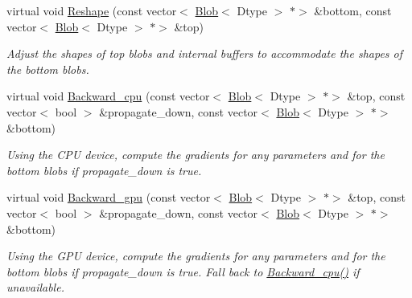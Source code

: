 \begin{DoxyCompactItemize}
\item 
virtual void \mbox{\hyperlink{classcaffe_1_1_base_data_layer_a2955d06a5e67609582fb293a0a37673f}{Reshape}} (const vector$<$ \mbox{\hyperlink{classcaffe_1_1_blob}{Blob}}$<$ Dtype $>$ $\ast$$>$ \&bottom, const vector$<$ \mbox{\hyperlink{classcaffe_1_1_blob}{Blob}}$<$ Dtype $>$ $\ast$$>$ \&top)
\begin{DoxyCompactList}\small\item\em Adjust the shapes of top blobs and internal buffers to accommodate the shapes of the bottom blobs. \end{DoxyCompactList}\item 
\mbox{\label{classcaffe_1_1_base_data_layer_a9d2c7a18383ff7625d80806ede1d9e3b}} 
virtual void \mbox{\hyperlink{classcaffe_1_1_base_data_layer_a9d2c7a18383ff7625d80806ede1d9e3b}{Backward\+\_\+cpu}} (const vector$<$ \mbox{\hyperlink{classcaffe_1_1_blob}{Blob}}$<$ Dtype $>$ $\ast$$>$ \&top, const vector$<$ bool $>$ \&propagate\+\_\+down, const vector$<$ \mbox{\hyperlink{classcaffe_1_1_blob}{Blob}}$<$ Dtype $>$ $\ast$$>$ \&bottom)
\begin{DoxyCompactList}\small\item\em Using the C\+PU device, compute the gradients for any parameters and for the bottom blobs if propagate\+\_\+down is true. \end{DoxyCompactList}\item 
\mbox{\label{classcaffe_1_1_base_data_layer_a537656c76260c7f669c713506a5f4651}} 
virtual void \mbox{\hyperlink{classcaffe_1_1_base_data_layer_a537656c76260c7f669c713506a5f4651}{Backward\+\_\+gpu}} (const vector$<$ \mbox{\hyperlink{classcaffe_1_1_blob}{Blob}}$<$ Dtype $>$ $\ast$$>$ \&top, const vector$<$ bool $>$ \&propagate\+\_\+down, const vector$<$ \mbox{\hyperlink{classcaffe_1_1_blob}{Blob}}$<$ Dtype $>$ $\ast$$>$ \&bottom)
\begin{DoxyCompactList}\small\item\em Using the G\+PU device, compute the gradients for any parameters and for the bottom blobs if propagate\+\_\+down is true. Fall back to \mbox{\hyperlink{classcaffe_1_1_base_data_layer_a9d2c7a18383ff7625d80806ede1d9e3b}{Backward\+\_\+cpu()}} if unavailable. \end{DoxyCompactList}\end{DoxyCompactItemize}
